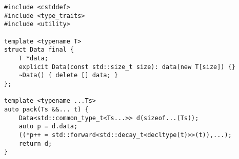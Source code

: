 \begin{lstlisting}[title=\href{https://godbolt.org/z/U-Nieu}{\texttt{godbolt.org/z/U-Nieu}}]
#include <cstddef>
#include <type_traits>
#include <utility>

template <typename T>
struct Data final {
    T *data;
    explicit Data(const std::size_t size): data(new T[size]) {}
    ~Data() { delete [] data; }
};

template <typename ...Ts>
auto pack(Ts &&... t) {
    Data<std::common_type_t<Ts...>> d(sizeof...(Ts));
    auto p = d.data;
    ((*p++ = std::forward<std::decay_t<decltype(t)>>(t)),...);
    return d;
}
\end{lstlisting}
